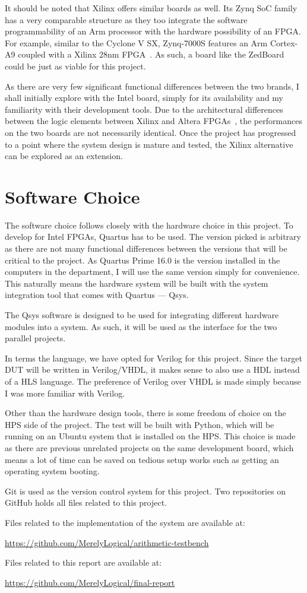 It should be noted that Xilinx offers similar boards as well.
Its Zynq SoC family has a very comparable structure as they too integrate the software programmability of an Arm processor with the hardware possibility of an FPGA.
For example, similar to the Cyclone V SX, Zynq-7000S features an Arm Cortex-A9
coupled with a Xilinx 28nm FPGA~\cite{Xilinx1}.
As such, a board like the ZedBoard~\cite{Xilinx2} could be just as viable for this project.

As there are very few significant functional differences between the two brands, I shall initially explore with the Intel board, simply for its availability and my familiarity with their development tools.
Due to the architectural differences between the logic elements between Xilinx and Altera FPGAs~\cite{Scekic1}, the performances on the two boards are not necessarily identical.
Once the project has progressed to a point where the system design is mature and tested, the Xilinx alternative can be explored as an extension.

\section{Software Choice}
The software choice follows closely with the hardware choice in this project.
To develop for Intel FPGAs, Quartus has to be used.
The version picked is arbitrary as there are not many functional differences between the versions that will be critical to the project.
As Quartus Prime 16.0 is the version installed in the computers in the department, I will use the same version simply for convenience.
This naturally means the hardware system will be built with the system integration tool that comes with Quartus --- Qsys.

The Qsys software is designed to be used for integrating different hardware modules into a system.
As such, it will be used as the interface for the two parallel projects.

In terms the language, we have opted for Verilog for this project.
Since the target DUT will be written in Verilog/VHDL, it makes sense to also use a HDL instead of a HLS language.
The preference of Verilog over VHDL is made simply because I was more familiar with Verilog.

Other than the hardware design tools, there is some freedom of choice on the HPS side of the project.
The test will be built with Python, which will be running on an Ubuntu system that is installed on the HPS.
This choice is made as there are previous unrelated projects on the same development board, which means a lot of time can be saved on tedious setup works such as getting an operating system booting.

Git is used as the version control system for this project.
Two repositories on GitHub holds all files related to this project.

Files related to the implementation of the system are available at:

\indent\indent\url{https://github.com/MerelyLogical/arithmetic-testbench}

Files related to this report are available at:

\indent\indent\url{https://github.com/MerelyLogical/final-report}